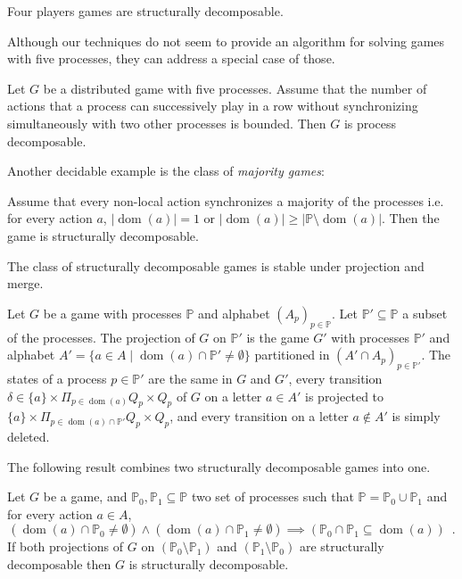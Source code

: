 \documentclass[a4paper,UKenglish]{lipics-v2016}
\newcommand{\PP}{\mathbb{P}}
\DeclareMathOperator{\dom}{dom}
\begin{document}
\begin{lemma}\label{lem:fourp}
Four players games are  structurally decomposable.
\end{lemma}

Although our techniques do not seem to provide an algorithm for solving games with five processes, they can address a special case of those.

\begin{lemma}\label{lem:fivep}
Let $G$ be a distributed game with five processes.
Assume that the number of actions
that a process can successively play in a row without 
synchronizing simultaneously with two other processes
is bounded.
Then $G$ is process decomposable.
\end{lemma}

Another decidable example is the class of \emph{majority games}:
\begin{lemma}\label{lem:majority}
Assume that every non-local action synchronizes a majority of the processes i.e. for every action $a$,
$
|\dom(a)| = 1 \text{ or }   | \dom(a) |  \geq | \PP \setminus \dom(a) |.
$
Then the game is  structurally decomposable.
\end{lemma}












The class of structurally decomposable games
is stable under projection and merge.

\begin{definition}
Let $G$ be a game with processes $\PP$ and
alphabet $(A_p)_{p\in\PP}$.
Let 
$\PP'\subseteq \PP$
a subset of the processes.
The projection of $G$ on $\PP'$ is the game $G'$
with processes $\PP'$ and alphabet
$A' = \{ a \in A \mid \dom(a) \cap \PP' \neq \emptyset \}$
partitioned in $(A' \cap A_p)_{p\in\PP'}$.
The states of a process $p\in\PP'$ are the same in $G$ and $G'$, every transition 
$\delta \in \{a\} \times \Pi_{p\in\dom(a)} Q_p\times Q_p$
of $G$ on a letter $a\in A'$
is projected to $\{a\} \times \Pi_{p\in\dom(a)\cap \PP'} Q_p\times Q_p$,
and every transition on a letter $a \not \in A'$ is simply deleted.
\end{definition}

The following result combines two structurally decomposable games into one.


\begin{lemma}\label{lem:merging}
Let $G$ be a game,
and $\PP_0, \PP_1\subseteq \PP$
 two set of processes such that $\PP=\PP_0\cup\PP_1$ and for every action $a\in A$,
\[
(\dom(a) \cap \PP_0\neq \emptyset)\land (\dom(a) \cap \PP_1\neq \emptyset)
\implies(\PP_0\cap \PP_1\subseteq \dom(a))\enspace.
\]
If both projections of $G$ on $(\PP_0\setminus \PP_1)$ and $(\PP_1\setminus \PP_0)$ are structurally decomposable then $G$ is structurally decomposable.
\end{lemma}
\end{document}

